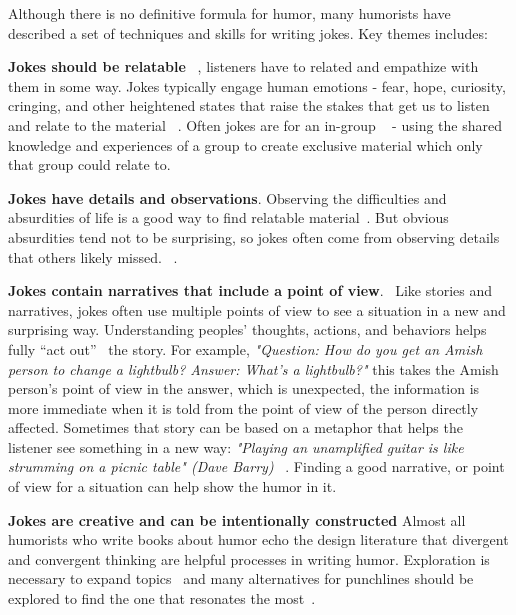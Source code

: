 Although there is no definitive formula for humor, many humorists have described a set of techniques and skills for writing jokes. Key themes includes:

\textbf{Jokes should be relatable} ~\cite{Dean2000,Holloway2010, Vorhaus1994, Kaplan2013,Carter2001}, listeners have to related and empathize with them in some way.  
Jokes typically engage human emotions - fear, hope, curiosity, cringing, and other heightened states that raise the stakes that get us to listen and relate to the material  ~\cite{Carter2001}.  
Often jokes are for an in-group ~\cite{hurley2011inside} - using the shared knowledge and experiences of a group to create exclusive material which only that group could relate to.


\textbf{Jokes have details and observations}. Observing the difficulties and absurdities of life is a good way to find relatable material~\cite{Kaplan2013}.  But obvious absurdities tend not to be surprising, so jokes often come from observing details that others likely missed. ~\cite{Carter2001, Vorhaus1994}.

\textbf{Jokes contain narratives that include a point of view}.~\cite{Carter2001} 
Like stories and narratives, jokes often use multiple points of view to see a situation in a new and surprising way. 
Understanding peoples' thoughts, actions, and behaviors helps fully ``act out''~\cite{Carter2001} the story. 
For example, \textit{"Question: How do you get an Amish person to change a lightbulb? Answer: What's a lightbulb?"} this takes the Amish person's point of view in the answer, which is unexpected, the information is more immediate when it is told from the point of view of the person directly affected.
Sometimes that story can be based on a metaphor that helps the listener see something in a new way: \textit{"Playing an unamplified guitar is like strumming on a picnic table" (Dave Barry)} ~\cite{sep_humor}. Finding a good narrative, or point of view for a situation can help show the humor in it.

\textbf{Jokes are creative and can be intentionally constructed}
Almost all humorists who write books about humor
echo the design literature that divergent and convergent thinking are helpful processes in writing humor. 
Exploration is necessary to expand topics~\cite{Holloway2010} and many alternatives for punchlines should be explored to find the one that resonates the most~\cite{humor_Dean2000}.

